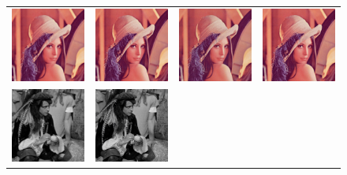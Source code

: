 \documentclass[10pt,twocolumn,letterpaper]{article}
\begin{document}
\begin{figure}[h!]
\begin{tabular}{cccc}
     	\includegraphics[width=1.5in]{images/used/appendix/jpg/Set14/lenna_bicubic}&
     	\includegraphics[width=1.5in]{images/used/appendix/jpg/Set14/lenna_SRResNet-MSE} &
     	\includegraphics[width=1.5in]{images/used/appendix/jpg/Set14/lenna_SRGAN-VGG54} & 
     	\includegraphics[width=1.5in]{images/used/appendix/jpg/Set14/lenna_HR} \\ 	
     	\includegraphics[width=1.5in]{images/used/appendix/jpg/Set14/man_bicubic}&
     	\includegraphics[width=1.5in]{images/used/appendix/jpg/Set14/man_SRResNet-MSE} &

\end{tabular}
\end{figure}
\end{document}
